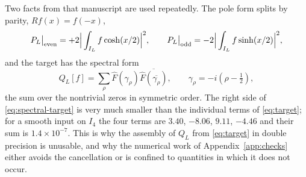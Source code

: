Two facts from that manuscript are used repeatedly. The pole form splits by
parity, $R f(x)=f(-x)$,
\begin{equation}\label{eq:parity-split}
 P_L\big|_{\rm even}=+2\Big|\int_{I_L}f\cosh(x/2)\Big|^2,\qquad
 P_L\big|_{\rm odd}=-2\Big|\int_{I_L}f\sinh(x/2)\Big|^2,
\end{equation}
and the target has the spectral form
\begin{equation}\label{eq:spectral-target}
 Q_L[f]=\sum_\rho\widehat F(\gamma_\rho)\overline{\widehat F(\overline{\gamma_\rho})},
 \qquad \gamma_\rho=-i(\rho-\tfrac12),
\end{equation}
the sum over the nontrivial zeros in symmetric order. The right side of
\eqref{eq:spectral-target} is very much smaller than the individual terms of
\eqref{eq:target}; for a smooth input on $I_4$ the four terms are
$3.40$, $-8.06$, $9.11$, $-4.46$ and their sum is $1.4\times10^{-7}$. This is why
the assembly of $Q_L$ from \eqref{eq:target} in double precision is unusable,
and why the numerical work of Appendix~\ref{app:checks} either avoids the
cancellation or is confined to quantities in which it does not occur.
